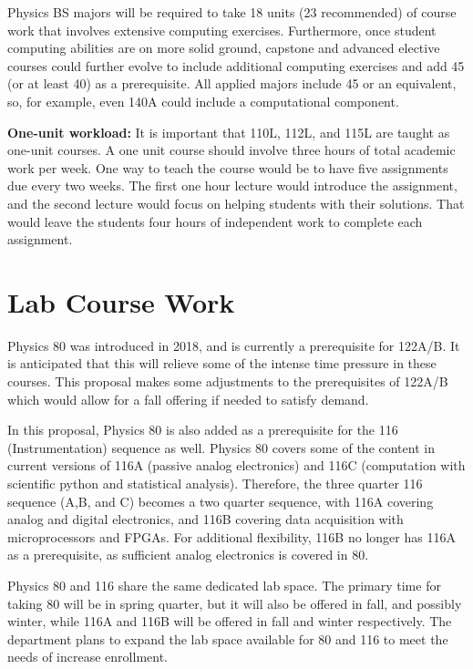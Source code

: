 \documentclass[12pt]{article}
\begin{document}
Physics BS majors will be required to take 18 units (23 recommended)
of course work that involves extensive computing exercises.
Furthermore, once student computing abilities are on more solid
ground, capstone and advanced elective courses could further evolve to
include additional computing exercises and add 45 (or at least 40) as
a prerequisite.  All applied majors include 45 or an equivalent, so,
for example, even 140A could include a computational component.

{\bf One-unit workload: }It is important that 110L, 112L, and 115L are
taught as one-unit courses.  A one unit course should involve three
hours of total academic work per week.  One way to teach the course
would be to have five assignments due every two weeks.  The first one
hour lecture would introduce the assignment, and the second lecture
would focus on helping students with their solutions.  That would
leave the students four hours of independent work to complete each
assignment.

\section{Lab Course Work}
\label{sec:labs}
Physics 80 was introduced in 2018, and is currently a prerequisite for
122A/B.  It is anticipated that this will relieve some of the intense
time pressure in these courses.  This proposal makes some adjustments
to the prerequisites of 122A/B which would allow for a fall offering
if needed to satisfy demand.

In this proposal, Physics 80 is also added as a prerequisite for the
116 (Instrumentation) sequence as well.  Physics 80 covers some of the
content in current versions of 116A (passive analog electronics) and
116C (computation with scientific python and statistical analysis).
Therefore, the three quarter 116 sequence (A,B, and C) becomes a two
quarter sequence, with 116A covering analog and digital electronics,
and 116B covering data acquisition with microprocessors and FPGAs.
For additional flexibility, 116B no longer has 116A as a prerequisite,
as sufficient analog electronics is covered in 80.

Physics 80 and 116 share the same dedicated lab space.  The primary
time for taking 80 will be in spring quarter, but it will also be
offered in fall, and possibly winter, while 116A and 116B will be
offered in fall and winter respectively.  The department plans to
expand the lab space available for 80 and 116 to meet the needs of
increase enrollment.
\end{document}
